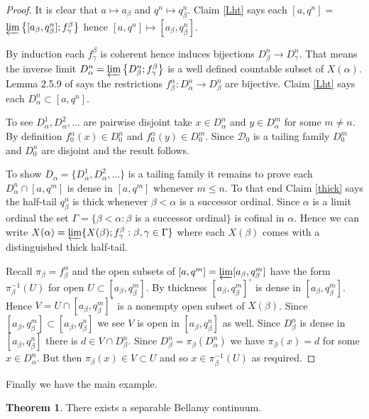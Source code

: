 \documentclass[12pt]{article}
\theoremstyle{plain}
\theoremstyle{definition}
\newcounter{dummy}
\newcounter{dummy4}
\newcounter{dummy3}
\newcounter{dummy5}
\newtheorem{thm5}[dummy5]{Theorem}
\newcounter{dummy6}
\newcommand{\A}{\ensuremath{\alpha}}
\newcommand{\B}{\ensuremath{\beta}}
\newcommand{\G}{\ensuremath{\gamma}}
\newcommand{\GG}{\ensuremath{\Gamma}}
\newcommand{\0}{\ensuremath{\varnothing}}
\newcommand{\cD}{\ensuremath{\mathcal D}}
\begin{document}
	\begin{proof}
		It is clear that $a \mapsto a_\B$ and $q^n \mapsto q^n_\B$. Claim \ref{Lht} says each $[a,q^n] = $ $\varprojlim \big \{[a_\B,q^n_\B] ; f^\B_\G \big \}$ hence $[a,q^n] \mapsto [a_\B,q^n_\B]$.
		
		By induction each $f^\B_\G$ is coherent hence induces bijections $D_\B^n \to D_\G^n$. That means the inverse limit $D^n_\A = \varprojlim \big \{D_\B^n; f^\B_\G \big \}$ is a well defined countable subset of $X(\A)$. Lemma 2.5.9 of \cite{Engelking} says the restrictions $f^\A_\B: D^n_\A \to D^n_\B$ are bijective. Claim \ref{Lht} says  each $D^n_\A \subset [a,q^n]$.
		
		To see $D^1_\A, D^2_\A,\ldots$ are pairwise disjoint take $x \in D^n_\A$ and $y \in D^m_\A$ for some $m \ne n$. By definition $f^\A_0(x) \in D_0^n$ and $f^\A_0(y) \in D_0^m$. Since $\cD_0$ is a tailing family $D_0^m$ and $D_0^n$ are disjoint and the result follows.
		
		To show $D_\A = \{D^1_\A, D^2_\A, \ldots\}$ is a tailing family it remains to prove each \mbox{$D_\A^n \cap [a,q^m]$} is dense in $[a,q^m]$ whenever $m \le n$. To that end Claim \ref{thick} says the half-tail $q^n_{\B}$ is thick whenever $\B < \A$ is a successor ordinal. Since $\A$ is a limit ordinal the set $\Gamma = \{\B < \A: \B$ is a successor ordinal$\}$ is cofinal in $\A$. Hence we can write $X(\A) = \varprojlim \{X(\B);f^{\B}_{\G}: \B,\G \in \GG\}$ where each $X(\B)$ comes with a distinguished thick half-tail.
		
		Recall $\pi_\B = f^\A_\B$ and the open subsets of $[a,q^m] = \varprojlim [a_\B,q_\B^m]$ 
		have the form $\pi^{-1}_\B(U)$ for open $U \subset [a_\B,q_\B^m]$.
		By thickness $[a_\B,q_\B^m]^\circ$ is dense in $[a_\B,q_\B^m]$.
		Hence $V = U \cap [a_\B,q_\B^m]^\circ$ is a nonempty open subset of $X(\B)$.
		Since $[a_\B,q_\B^m] \subset [a_\B,q_\B^n]$ we see $V$ is open in $[a_\B,q_\B^n]$ as well.
		Since $D_\B^n$ is dense in $[a_\B,q_\B^n]$ there is $d \in V \cap D_\B^n$.
		Since $D_\B^n = \pi_\B(D^n_\A)$ we have $\pi_\B(x) = d$ for some $x \in D^n_\A$. But then $\pi_\B(x) \in V \subset U$ and so $x \in \pi_\B^{-1}(U)$ as required.
	\end{proof}
	
	Finally we have the main example.
	
	\begin{thm5} \label{5thm5}
		There exists a separable Bellamy continuum.
	\end{thm5}
	
\end{document}
